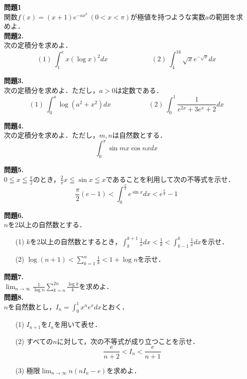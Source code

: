 \documentclass[a4paper]{ltjsarticle}
\title{}
\author{}
\date{}
\begin{document}
\noindent \textbf{問題1}\\
関数$f(x)=(x+1)e^{-ax^2}~\displaystyle{(0<x<\pi)}$が極値を持つような実数$a$の範囲を求めよ．\\

\noindent \textbf{問題2.}\\
次の定積分を求めよ．
\[(1)~\int_1^ex(\log x)^2dx~~~~~~~~~~~~~~~~~~~~~~~~~~~~~(2)~\int_4^{16}\sqrt{x}e^{-\sqrt x}dx\]

\noindent \textbf{問題3.}\\
次の定積分を求めよ．ただし，$a>0$は定数である．
\[(1)~\int_0^a\log(a^2+x^2)dx~~~~~~~~~~~~~~~~~~~~~~~~~(2)~\int_0^1\frac{1}{e^{2x}+3e^x+2}dx\]

\noindent \textbf{問題4.}\\
次の定積分を求めよ．ただし，$m,n$は自然数とする．
\[\int _0^\pi \sin mx\cos nx dx\]

\noindent \textbf{問題5.}\\
$\displaystyle{0\leqq x\leqq \frac{\pi}{2}}$のとき，$\displaystyle{\frac{2}{\pi}x\leqq \sin x\leqq x}$であることを利用して次の不等式を示せ．
\[\frac{\pi}{2}(e-1)<\int_0^{\frac\pi2}e^{\sin x}dx<e^{\frac\pi2}-1\]

\noindent \textbf{問題6.}\\
$n$を2以上の自然数とする．\begin{itemize}    
   \item [(1)]$k$を2以上の自然数とするとき，$\displaystyle{\int_k^{k+1}\frac1xdx<\frac1k<\int_{k-1}^k \frac1xdx}$を示せ．
    \item [(2)]$\displaystyle{\log(n+1)<\sum_{k=1}^n\frac1k<1+\log n}$を示せ．
\end{itemize}

\noindent \textbf{問題7.}\\
$\displaystyle{\lim_{n\to\infty}\frac{1}{\log n}\sum_{k=n}^{2n}\frac{\log k}{k}}$を求めよ．\\

\noindent \textbf{問題8.}\\
$n$を自然数とし，$\displaystyle{I_n=\int_0^1x^ne^xdx}$とおく．
\begin{itemize}
    \item [(1)]$I_{n+1}$を$I_{n}$を用いて表せ．
    \item [(2)]すべての$n$に対して，次の不等式が成り立つことを示せ．
    \[\frac{e}{n+2}<I_n<\frac{e}{n+1}\]
    \item [(3)]極限$\displaystyle{\lim_{n\to\infty}n(nI_n-e)}$を求めよ．
\end{itemize}
\end{document}
